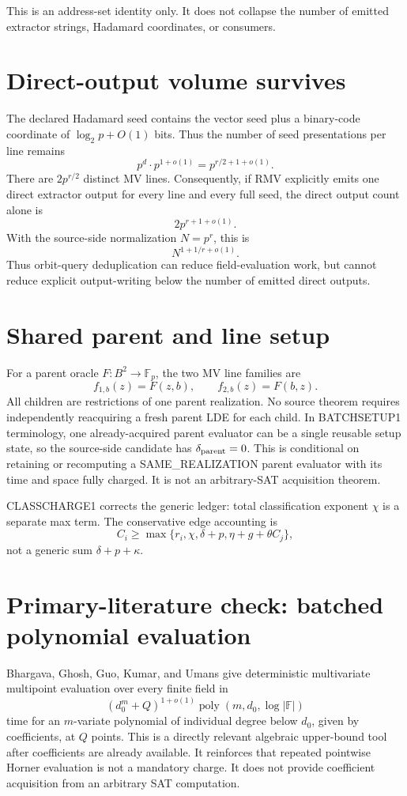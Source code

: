\documentclass[11pt]{article}
\begin{document}
This is an address-set identity only. It does not collapse the number of emitted extractor strings, Hadamard coordinates, or consumers.

\section*{Direct-output volume survives}
The declared Hadamard seed contains the vector seed plus a binary-code coordinate of \(\log_2p+O(1)\) bits. Thus the number of seed presentations per line remains
\[
p^d\cdot p^{1+o(1)}=p^{r/2+1+o(1)}.
\]
There are \(2p^{r/2}\) distinct MV lines. Consequently, if RMV explicitly emits one direct extractor output for every line and every full seed, the direct output count alone is
\[
2p^{r+1+o(1)}.
\]
With the source-side normalization \(N=p^r\), this is
\[
\boxed{N^{1+1/r+o(1)}}.
\]
Thus orbit-query deduplication can reduce field-evaluation work, but cannot reduce explicit output-writing below the number of emitted direct outputs.

\section*{Shared parent and line setup}
For a parent oracle \(F:B^2\to\mathbb F_p\), the two MV line families are
\[
f_{1,b}(z)=F(z,b),\qquad f_{2,b}(z)=F(b,z).
\]
All children are restrictions of one parent realization. No source theorem requires independently reacquiring a fresh parent LDE for each child. In BATCHSETUP1 terminology, one already-acquired parent evaluator can be a single reusable setup state, so the source-side candidate has \(\delta_{\rm parent}=0\). This is conditional on retaining or recomputing a SAME\_REALIZATION parent evaluator with its time and space fully charged. It is not an arbitrary-SAT acquisition theorem.

CLASSCHARGE1 corrects the generic ledger: total classification exponent \(\chi\) is a separate max term. The conservative edge accounting is
\[
C_i\ge\max\{r_i,\chi,\delta+p,\eta+g+\theta C_j\},
\]
not a generic sum \(\delta+p+\kappa\).

\section*{Primary-literature check: batched polynomial evaluation}
Bhargava, Ghosh, Guo, Kumar, and Umans give deterministic multivariate multipoint evaluation over every finite field in
\[
(d_0^m+Q)^{1+o(1)}\operatorname{poly}(m,d_0,\log|\mathbb F|)
\]
time for an \(m\)-variate polynomial of individual degree below \(d_0\), given by coefficients, at \(Q\) points. This is a directly relevant algebraic upper-bound tool after coefficients are already available. It reinforces that repeated pointwise Horner evaluation is not a mandatory charge. It does not provide coefficient acquisition from an arbitrary SAT computation.
\end{document}
